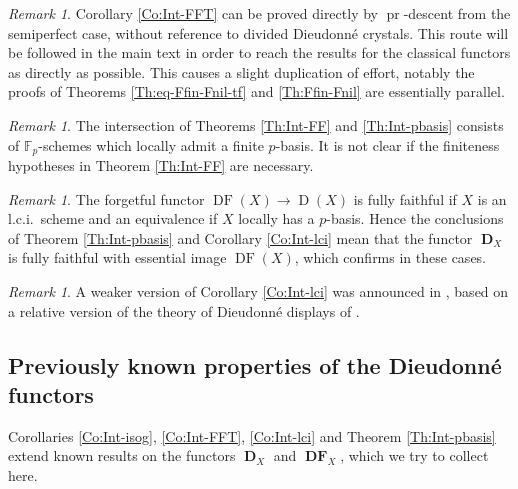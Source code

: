 \documentclass[a4paper,11pt]{article}
\theoremstyle{plain}
\theoremstyle{definition}
\theoremstyle{remark}
\newtheorem{Remark}[Lemma]{Remark}
\theoremstyle{definition}
\numberwithin{Lemma}{section}
\numberwithin{Subpoint}{Lemma}
\numberwithin{equation}{section}
\newcommand{\DD}{{\mathbb{D}}}
\newcommand{\FF}{{\mathbb{F}}}
\DeclareMathOperator{\Dcat}{D}
\DeclareMathOperator{\Dfun}{\mathbf D} %
\DeclareMathOperator{\DFcat}{DF}
\DeclareMathOperator{\DFfun}{\mathbf{DF}} %
\newcommand{\nameoftop}{{\operatorname{pr}}}
\newcommand{\chang}[1]{{#1}}
\begin{document}
\begin{Remark}
\chang{Corollary \ref{Co:Int-FFT} can be proved directly by
$\nameoftop$-descent from the semiperfect case,
without reference to divided Dieudonn\'e crystals.
This route will be followed in the main text in order to reach the results for the classical functors as directly as possible. This causes a slight duplication of effort, notably the proofs of Theorems \ref{Th:eq-Ffin-Fnil-tf} and \ref{Th:Ffin-Fnil} are essentially parallel.}
\end{Remark}

\begin{Remark}
\chang{The intersection of Theorems \ref{Th:Int-FF} and \ref{Th:Int-pbasis} consists of $\FF_p$-schemes which locally admit a finite $p$-basis. It is not clear if the finiteness hypotheses in Theorem \ref{Th:Int-FF} are necessary.}
\end{Remark}

\begin{Remark}
\chang{The forgetful functor $\DFcat(X)\to\Dcat(X)$ is fully faithful if $X$ is an l.c.i.\ scheme and an equivalence if $X$ locally has a $p$-basis.}
Hence the conclusions of  
Theorem \ref{Th:Int-pbasis} and Corollary \ref{Co:Int-lci}
mean that the functor $\Dfun_X$ is fully faithful 
with essential image $\DFcat(X)$,
which confirms \cite[p.~108, Probl\`eme 1]{Grothendieck:Montreal}
in these cases.
\end{Remark}

\begin{Remark}
A weaker version of Corollary \ref{Co:Int-lci} was announced in
\cite{Lau:OWR2015}, 
based on a relative version of the theory of Dieudonn\'e displays
of \cite{Zink:DDisp, Lau:Relations}.
\end{Remark}


\subsection*{Previously known properties of the Dieudonn\'e functors}

Corollaries \ref{Co:Int-isog}, \ref{Co:Int-FFT}, \ref{Co:Int-lci}
and Theorem \ref{Th:Int-pbasis}
extend known results on the functors $\Dfun_X$ and $\DFfun_X$,
which we try to collect here.
\end{document}
